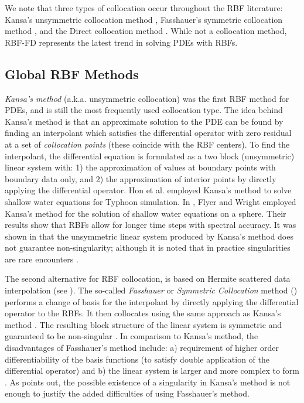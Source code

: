 \documentclass{report}
\begin{document}
{We note that three types of collocation occur throughout the RBF literature: 
Kansa's unsymmetric collocation method \cite{Kansa1990a, Kansa1990b}, Fasshauer's symmetric collocation method \cite
{Fasshauer1997}, and the Direct collocation method \cite{Fedoseyev2002}. While not a collocation method, RBF-FD represents the latest trend in solving PDEs with RBFs.  %

\subsection{Global RBF Methods}

\emph{Kansa's method} \cite{Kansa1990a, Kansa1990b} (a.k.a. unsymmetric collocation) was the first RBF method for PDEs, and is still the most frequently used collocation type. The idea behind Kansa's method is that an 
approximate solution to the PDE can be found by finding an interpolant which satisfies the differential operator with zero residual at a set of \emph{collocation points} (these coincide with the RBF centers). To find the interpolant, the differential equation is formulated as a two block (unsymmetric) linear system with: 1) the approximation of values 
at boundary 
points with boundary data only, and 2) the approximation of interior points by directly applying the differential operator. Hon et al. \cite{Hon1999} employed Kansa's method to solve shallow water equations for Typhoon simulation. In 
\cite{Flyer2009b}, Flyer and Wright employed Kansa's method for the solution of shallow water equations on a sphere. Their 
results show that RBFs allow for longer time steps with spectral accuracy. It was 
shown in \cite{Fasshauer1997, Hon2001} that the unsymmetric linear system produced by Kansa's method does not guarantee 
non-singularity; although it is noted that in practice singularities are rare encounters \cite{Larsson2003}. 

The second alternative for RBF collocation, is based on Hermite scattered 
data interpolation (see \cite{Wu1992}). The so-called \emph{Fasshauer} or \emph{Symmetric Collocation} method (\cite{Fasshauer1997}) 
performs a change of basis for the interpolant by directly applying the differential operator to the RBFs. It then collocates using the same approach as Kansa's method \cite{Stevens2009b, Larsson2003}. The resulting block structure of the linear system is symmetric and 
guaranteed to be non-singular \cite{Fasshauer1997}. In comparison to Kansa's method, the disadvantages of Fasshauer's method 
include: a) requirement of higher order differentiability of the basis functions (to satisfy double application of the differential operator)
and b) the linear system is larger and more complex to form
 \cite{Fasshauer2007}. As \cite{Hon2001} points out, 
the possible existence of a singularity in Kansa's method is not enough to justify the added difficulties of using Fasshauer's 
method.

}
\end{document}
